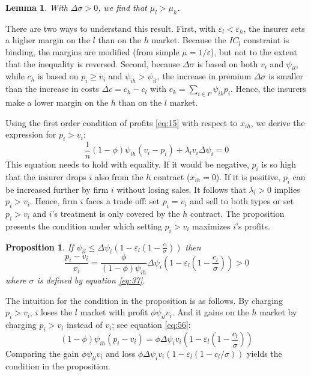 \documentclass[a4paper,12pt]{article}
\newtheorem{lemma}{Lemma}
\newtheorem{proposition}{Proposition}
\begin{document}
\begin{lemma}
\label{Linear_pricing_profit_margins}
With \(\Delta \sigma > 0\), we find that \(\mu_l > \mu_h\).
\end{lemma}

There are two ways to understand this result. First, with \(\varepsilon_l < \varepsilon_h\), the insurer sets a higher margin on the \(l\) than on the \(h\) market. Because the \(IC_l\) constraint is binding, the margins are modified (from simple \(\mu=1/\varepsilon\)), but not to the extent that the inequality is reversed. Second, because \(\Delta \sigma\) is based on both \(v_i\) and \(\psi_{il}\), while \(c_h\) is based on \(p_i \geq v_i\) and \(\psi_{ih} > \psi_{il}\), the increase in premium \(\Delta \sigma\) is smaller than the increase in costs \(\Delta c = c_h - c_l\) with \(c_k = \sum_{i \in P} \psi_{ik} p_i\). Hence, the insurers make a lower margin on the \(h\) than on the \(l\) market.

Using the first order condition of profits \eqref{eq:15} with respect to \(x_{ih}\), we derive the expression for \(p_i>v_i\):
\begin{equation}
\label{eq:55}
\frac{1}{n}(1-\phi)\psi_{ih}(v_i-p_i) + \lambda_l v_i \Delta \psi_i = 0
\end{equation}
This equation needs to hold with equality. If it would be negative, \(p_i\) is so high that the insurer drops \(i\) also from the \(h\) contract (\(x_{ih}=0\)). If it is positive, \(p_i\) can be increased further by firm \(i\) without losing sales. It follows that \(\lambda_l>0\) implies \(p_i>v_i\). Hence, firm \(i\) faces a trade off: set \(p_i=v_i\) and sell to both types or set \(p_i>v_i\) and \(i\)'s treatment is only covered by the \(h\) contract. The proposition presents the condition under which setting \(p_i>v_i\) maximizes \(i\)'s profits.

\begin{proposition}
\label{Linear_price_above_value}
If \(\psi_{il} \leq \Delta \psi_i (1-\varepsilon_l (1-\frac{c_l}{\sigma}))\) then
\begin{equation}
\label{eq:56}
\frac{p_i-v_i}{v_i} = \frac{\phi}{(1-\phi)\psi_{ih}} \Delta \psi_i (1-\varepsilon_l (1-\frac{c_l}{\sigma})) > 0
\end{equation}
where \(\sigma\) is defined by equation \eqref{eq:37}.
\end{proposition}

The intuition for the condition in the proposition is as follows. By charging \(p_i > v_i\), \(i\) loses the \(l\) market with profit \(\phi \psi_{il} v_i\). And it gains on the \(h\) market by charging \(p_i > v_i\) instead of \(v_i\); see equation \eqref{eq:56}:
\begin{equation}
\label{eq:63}
(1-\phi) \psi_{ih} (p_i-v_i)= \phi \Delta \psi_i v_i (1-\varepsilon_l (1-\frac{c_l}{\sigma}))
\end{equation}
Comparing the gain \(\phi \psi_{il} v_i\) and loss \(\phi \Delta \psi_i v_i (1-\varepsilon_l (1-c_l/\sigma))\) yields the condition in the proposition.
\end{document}
